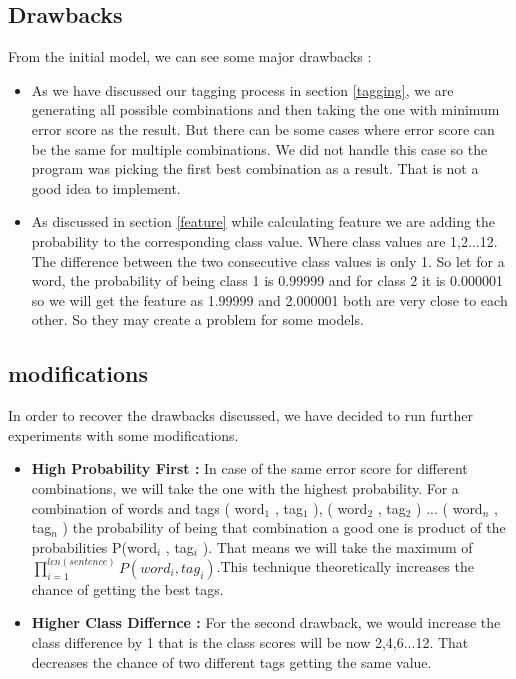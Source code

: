 \documentclass{standalone}
\begin{document}
\subsection{Drawbacks}
From the initial model, we can see some major drawbacks :
\begin{itemize}
    \item As we have discussed our tagging process in section \ref{tagging}, we are generating all possible combinations and then taking the one with minimum error score as the result. But there can be some cases where error score can be the same for multiple combinations. We did not handle this case so the program was picking the first best combination as a result. That is not a good idea to implement.
    \item As discussed in section \ref{feature} while calculating feature we are adding the probability to the corresponding class value. Where class values are 1,2...12. The difference between the two consecutive class values is only 1. So let for a word, the probability of being class 1 is 0.99999 and for class 2 it is 0.000001 so we will get the feature as 1.99999 and 2.000001 both are very close to each other. So they may create a problem for some models.
\end{itemize}
\subsection{modifications}
In order to recover the drawbacks discussed, we have decided to run further experiments with some modifications.
\begin{itemize}
    \item \textbf{High Probability First :} In case of the same error score for different combinations, we will take the one with the highest probability. For a combination of words and tags  ( word$_1$ , tag$_1$ ), ( word$_2$ , tag$_2$ ) ... ( word$_n$ , tag$_n$ ) the probability of being that combination a good one is product of the probabilities P(word$_i$ , tag$_i$ ). That means we will take the maximum of $\prod_{i=1}^{len(sentence)} P(word_i , tag_i)$.This technique theoretically  increases the chance of getting the best tags.
    
    \item \textbf{Higher Class Differnce :} For the second drawback, we would increase the class difference by 1 that is the class scores will be now 2,4,6...12. That decreases the chance of two different tags getting the same value. 
\end{itemize}
\end{document}
